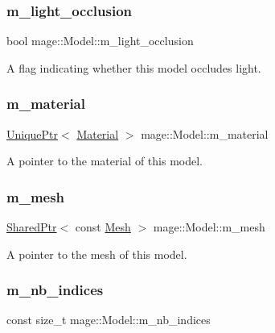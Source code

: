 \subsubsection{\texorpdfstring{m\+\_\+light\+\_\+occlusion}{m\_light\_occlusion}}
{\footnotesize\ttfamily bool mage\+::\+Model\+::m\+\_\+light\+\_\+occlusion\hspace{0.3cm}{\ttfamily [private]}}

A flag indicating whether this model occludes light. \hypertarget{classmage_1_1_model_a88d97cd87b7ef37130f7a4007477698a}{}\label{classmage_1_1_model_a88d97cd87b7ef37130f7a4007477698a} 
\subsubsection{\texorpdfstring{m\+\_\+material}{m\_material}}
{\footnotesize\ttfamily \hyperlink{namespacemage_a3316d7143a973e37adf1110f2e80ca31}{Unique\+Ptr}$<$ \hyperlink{classmage_1_1_material}{Material} $>$ mage\+::\+Model\+::m\+\_\+material\hspace{0.3cm}{\ttfamily [private]}}

A pointer to the material of this model. \hypertarget{classmage_1_1_model_aecd2b4031c5df30fb5f7ed6d62810f73}{}\label{classmage_1_1_model_aecd2b4031c5df30fb5f7ed6d62810f73} 
\subsubsection{\texorpdfstring{m\+\_\+mesh}{m\_mesh}}
{\footnotesize\ttfamily \hyperlink{namespacemage_a1e01ae66713838a7a67d30e44c67703e}{Shared\+Ptr}$<$ const \hyperlink{classmage_1_1_mesh}{Mesh} $>$ mage\+::\+Model\+::m\+\_\+mesh\hspace{0.3cm}{\ttfamily [private]}}

A pointer to the mesh of this model. \hypertarget{classmage_1_1_model_a1fcf80ed9f3002bd2319ef83f073ae75}{}\label{classmage_1_1_model_a1fcf80ed9f3002bd2319ef83f073ae75} 
\subsubsection{\texorpdfstring{m\+\_\+nb\+\_\+indices}{m\_nb\_indices}}
{\footnotesize\ttfamily const size\+\_\+t mage\+::\+Model\+::m\+\_\+nb\+\_\+indices\hspace{0.3cm}{\ttfamily [private]}}

